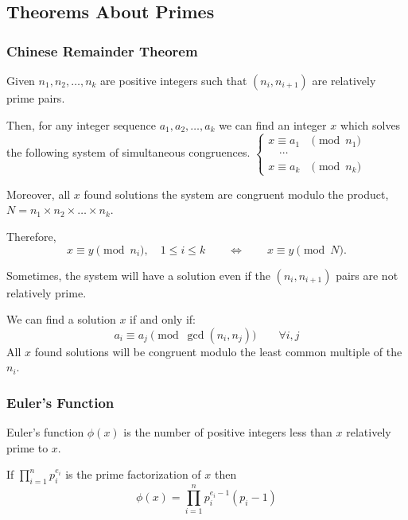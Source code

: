 \subsection{Theorems About Primes}


\subsubsection{Chinese Remainder Theorem}


Given $n_{1},n_{2}, \ldots, n_{k}$ are positive integers such that $(n_{i},n_{i+1})$ are relatively prime pairs. 

Then, for any integer sequence $a_{1},a_{2}, \ldots, a_{k}$ we can find an integer $x$ which solves the following system of simultaneous congruences.
$ {\begin{cases}x\equiv a_{1}&{\pmod {n_{1}}}\\\quad \cdots \\x\equiv a_{k}&{\pmod {n_{k}}}\end{cases}} $

\smallskip

Moreover, all $x$ found solutions the system are congruent modulo the product, $N = n_{1} \times n_{2} \times \ldots \times n_{k}$. 

\smallskip

Therefore, 
\[x\equiv y{\pmod {n_{i}}},\quad 1\leq i\leq k\qquad \Longleftrightarrow \qquad x\equiv y{\pmod {N}}. \]

\medskip

Sometimes, the system will have a solution even if the $(n_{i},n_{i+1})$ pairs are not relatively prime. 

We can find a solution $x$ if and only if:
\[ a_{i}\equiv a_{j}{\pmod {\gcd(n_{i},n_{j})}}\qquad \forall i,j \]
All $x$ found solutions will be congruent modulo the least common multiple of the $n_{i}$.



\subsubsection{Euler's Function}

Euler's function $\phi(x)$ is the number of positive integers less than $x$ relatively prime to $x$.

\smallskip

If $\prod_{i=1}^n p^{e_{i}}_{i}$ is the prime factorization of $x$ then
\[\phi(x) = \prod_{i=1}^{n} p^{e_{i} - 1}_{i} (p_{i} - 1)\]

